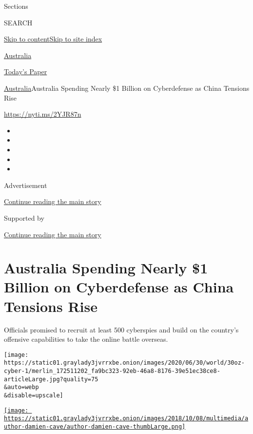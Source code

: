 Sections

SEARCH

\protect\hyperlink{site-content}{Skip to
content}\protect\hyperlink{site-index}{Skip to site index}

\href{https://www.nytimes3xbfgragh.onion/section/world/australia}{Australia}

\href{https://myaccount.nytimes3xbfgragh.onion/auth/login?response_type=cookie\&client_id=vi}{}

\href{https://www.nytimes3xbfgragh.onion/section/todayspaper}{Today's
Paper}

\href{/section/world/australia}{Australia}\textbar{}Australia Spending
Nearly \$1 Billion on Cyberdefense as China Tensions Rise

\url{https://nyti.ms/2YJR87n}

\begin{itemize}
\item
\item
\item
\item
\item
\end{itemize}

Advertisement

\protect\hyperlink{after-top}{Continue reading the main story}

Supported by

\protect\hyperlink{after-sponsor}{Continue reading the main story}

\hypertarget{australia-spending-nearly-1-billion-on-cyberdefense-as-china-tensions-rise}{%
\section{Australia Spending Nearly \$1 Billion on Cyberdefense as China
Tensions
Rise}\label{australia-spending-nearly-1-billion-on-cyberdefense-as-china-tensions-rise}}

Officials promised to recruit at least 500 cyberspies and build on the
country's offensive capabilities to take the online battle overseas.

\texttt{[image: https://static01.graylady3jvrrxbe.onion/images/2020/06/30/world/30oz-cyber-1/merlin\_172511202\_fa9bc323-92eb-46a8-8176-39e51ec38ce8-articleLarge.jpg?quality=75\\\&auto=webp\\\&disable=upscale]}

\href{https://www.nytimes3xbfgragh.onion/by/damien-cave}{\texttt{[image: https://static01.graylady3jvrrxbe.onion/images/2018/10/08/multimedia/author-damien-cave/author-damien-cave-thumbLarge.png]}}

